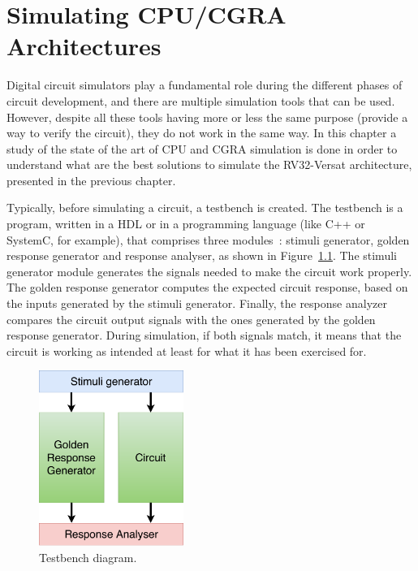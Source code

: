 
\chapter{Simulating CPU/CGRA Architectures}
\label{chapter:simulators}

Digital circuit simulators play a fundamental role during the different phases
of circuit development, and there are multiple simulation tools that can be
used. However, despite all these tools having more or less the same purpose
(provide a way to verify the circuit), they do not work in the same way. In this
chapter a study of the state of the art of \ac{CPU} and \ac{CGRA} simulation is
done in order to understand what are the best solutions to simulate the
RV32-Versat architecture, presented in the previous chapter.

Typically, before simulating a circuit, a testbench is created. The testbench
is a program, written in a \ac{HDL} or in a programming language (like C++ or
SystemC, for example), that comprises three modules~\cite{tan:vhstas}: stimuli
generator, golden response generator and response analyser, as shown in
Figure~\ref{fig:tb}. The stimuli generator module generates the signals needed
to make the circuit work properly. The golden response generator computes the
expected circuit response, based on the inputs generated by the stimuli
generator. Finally, the response analyzer compares the circuit output signals
with the ones generated by the golden response generator. During simulation, if
both signals match, it means that the circuit is working as intended at least
for what it has been exercised for.

\begin{figure}[!htb]
	\centering
	\includegraphics[width=0.42\textwidth]{Figures/Testbench.pdf}
	\caption{Testbench diagram.}
	\label{fig:tb}
\end{figure}

